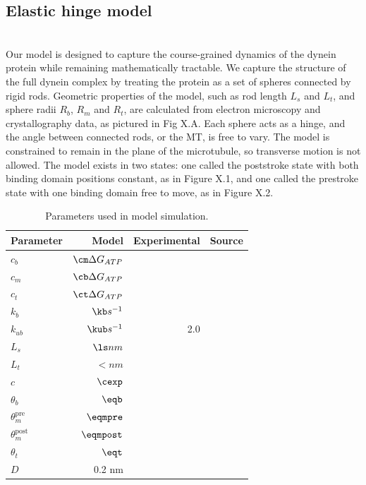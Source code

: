 \documentclass[9pt,twocolumn,twoside]{pnas-new}
\begin{document}
\subsection*{Elastic hinge model}~\\
Our model is designed to capture the course-grained dynamics of the dynein protein while remaining mathematically tractable. We capture the structure of the full dynein complex by treating the protein as a set of spheres connected by rigid rods. Geometric properties of the model, such as rod length $L_s$ and $L_t$, and sphere radii $R_b$, $R_m$ and $R_t$, are calculated from electron microscopy and crystallography data, as pictured in Fig X.A. Each sphere acts as a hinge, and the angle between connected rods, or the MT, is free to vary. The model is constrained to remain in the plane of the microtubule, so transverse motion is not allowed. The model exists in two states: one called the poststroke state with both binding domain positions constant, as in Figure X.1, and one called the prestroke state with one binding domain free to move, as in Figure X.2.

\begin{table}[tbhp]
\centering
\caption{Parameters used in model simulation.}
\label{tab:staticparams}
\begin{tabular}{lrrr}
Parameter & Model & Experimental & Source \\
\midrule
$c_b$ & $\cm \Delta G_{ATP}$ &  & \\
$c_m$ & $\cb \Delta G_{ATP}$ &  & \\
$c_t$ & $\ct \Delta G_{ATP}$ &  & \\
$k_b$ & $\kb s^{-1}$&  & \\
$k_{ub}$ & $\kub s^{-1}$ & 2.0 & \\
$L_s$ & $\ls nm$ & & \cite{nativestructure}\\
$L_t$ & $\lt nm$ & & \cite{nativestructure}\\
$c$ & $\cexp$ & & \\
$\theta_b$ & $\eqb$ &  & \\
$\theta_m^{\mbox{pre}}$ & $\eqmpre$ &  & \\
$\theta_m^{\mbox{post}}$ & $\eqmpost$ &  & \\
$\theta_t$ & $\eqt$ &  & \\
$D$ & 0.2 nm &  & \\

\bottomrule
\end{tabular}

\end{table}
\end{document}
